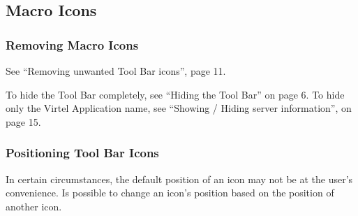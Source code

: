 \documentclass[letterpaper,10pt,english]{sphinxmanual}
\begin{document}
\subsection{Macro Icons}
\label{\detokenize{Customization:macro-icons}}\label{\detokenize{Customization:index-30}}
\ignorespaces 

\subsubsection{Removing Macro Icons}
\label{\detokenize{Customization:removing-macro-icons}}\label{\detokenize{Customization:index-31}}
See “Removing unwanted Tool Bar icons”, page 11.

To hide the Tool Bar completely, see “Hiding the Tool Bar” on page 6. To hide only the Virtel Application name, see “Showing / Hiding server information”, on page 15.


\subsubsection{Positioning Tool Bar Icons}
\label{\detokenize{Customization:positioning-tool-bar-icons}}
In certain circumstances, the default position of an icon may not be at the user’s convenience. Is possible to change an icon’s position based on the position of another icon.
\end{document}
